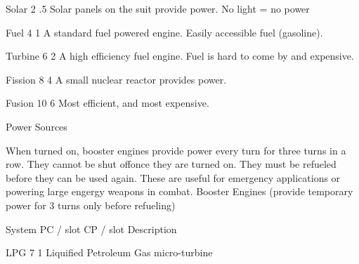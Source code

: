 \documentclass[twoside]{book}
\begin{document}
                      
                       Solar   
                       2   
                       .5   
                         Solar panels on the suit provide power. No
                         light = no power 
                      
                      
                       Fuel   
                       4   
                       1   
                         A standard fuel powered engine. Easily
                         accessible fuel (gasoline). 
                      
                      
                       Turbine   
                       6   
                       2   
                         A high efficiency fuel engine. Fuel is
                         hard to come by and expensive. 
                      
                      
                       Fission   
                       8   
                       4   
                         A small nuclear reactor provides power.
                         
                      
                      
                       Fusion   
                       10   
                       6   
                         Most efficient, and most expensive.
                         
                      
                    
                  Power Sources  
                  
                    When turned on, booster engines provide power
                   every turn for three turns in a row. They cannot be
                   shut offonce they are turned on. They must be refueled
                   before they can be used again. These are useful for
                   emergency applications or powering large engergy
                   weapons in combat. 
                    Booster Engines (provide temporary power for 3
                   turns only before refueling) 
                  
                    
                      
                       System 
                       PC / slot   
                       CP / slot 
                       Description   
                      
                      
                       LPG   
                       7   
                       1   
                         Liquified Petroleum Gas micro-turbine
                         
\end{document}
